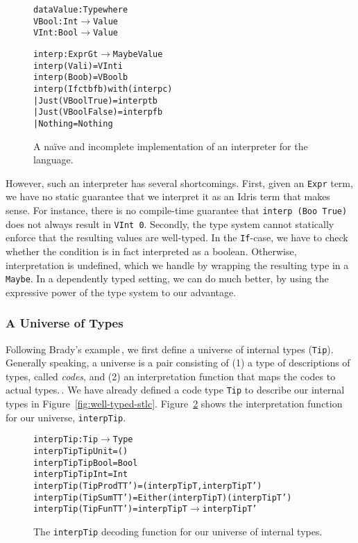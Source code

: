 \begin{figure}
\begin{alltt}
data Value : Type where
  VBool : Int \(\to\) Value
  VInt  : Bool \(\to\) Value

interp : Expr G t \(\to\) Maybe Value
interp (Val i) = VInt i
interp (Boo b) = VBool b
interp (If c tb fb) with (interp c)
  | Just (VBool True)  = interp tb
  | Just (VBool False) = interp fb
  | Nothing            = Nothing
\end{alltt}
\caption{A na\"{i}ve and incomplete implementation of an interpreter for the language.}
\label{fig:naive-interpreter-impl}
\end{figure}

However, such an interpreter has several shortcomings. First, given an \texttt{Expr} term, we have no static guarantee that we interpret it as an Idris term that makes sense. For instance, there is no compile-time guarantee that \texttt{interp (Boo True)} does not always result in \texttt{VInt 0}. Secondly, the type system cannot statically enforce that the resulting values are well-typed. In the \texttt{If}-case, we have to check whether the condition is in fact interpreted as a boolean. Otherwise, interpretation is undefined, which we handle by wrapping the resulting type in a \texttt{Maybe}. In a dependently typed setting, we can do much better, by using the expressive power of the type system to our advantage.

\subsubsection{A Universe of Types}
Following Brady's example\,\cite{Brady:IdrisTutorial}, we first define a universe of internal types (\texttt{Tip}). Generally speaking, a universe is a pair consisting of (1) a type of descriptions of types, called \emph{codes}, and (2) an interpretation function that maps the codes to actual types.\,\cite{Oury:2008}. We have already defined a code type \texttt{Tip} to describe our internal types in Figure~\ref{fig:well-typed-stlc}. Figure~\ref{fig:interpTip} shows the interpretation function for our universe, \texttt{interpTip}.

\begin{figure}
\begin{alltt}
interpTip : Tip \(\to\) Type
interpTip TipUnit        = ()
interpTip TipBool        = Bool
interpTip TipInt         = Int
interpTip (TipProd T T') = (interpTip T, interpTip T')
interpTip (TipSum T T')  = Either (interpTip T) (interpTip T')
interpTip (TipFun T T')  = interpTip T \(\to\) interpTip T'
\end{alltt}
\caption{The \texttt{interpTip} decoding function for our universe of internal types.}
\label{fig:interpTip}
\end{figure}

